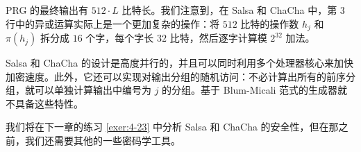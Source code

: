 \vspace*{10pt}

\noindent
PRG 的最终输出有 $512\cdot L$ 比特长。我们注意到，在 Salsa 和 ChaCha 中，第 $3$ 行中的异或运算实际上是一个更加复杂的操作：将 $512$ 比特的操作数 $h_j$ 和 $\pi(h_j)$ 拆分成 $16$ 个字，每个字长 $32$ 比特，然后逐字计算模 $2^{32}$ 加法。

Salsa 和 ChaCha 的设计是高度并行的，并且可以同时利用多个处理器核心来加快加密速度。此外，它还可以实现对输出分组的随机访问：不必计算出所有的前序分组，就可以单独计算输出中编号为 $j$ 的分组。基于 Blum-Micali 范式的生成器就不具备这些特性。

我们将在下一章的练习 \ref{exer:4-23} 中分析 Salsa 和 ChaCha 的安全性，但在那之前，我们还需要其他的一些密码学工具。


